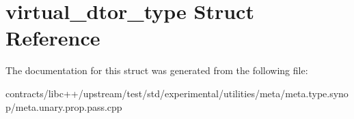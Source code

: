 \hypertarget{structvirtual__dtor__type}{}\section{virtual\+\_\+dtor\+\_\+type Struct Reference}
\label{structvirtual__dtor__type}


The documentation for this struct was generated from the following file\+:\begin{DoxyCompactItemize}
\item 
contracts/libc++/upstream/test/std/experimental/utilities/meta/meta.\+type.\+synop/meta.\+unary.\+prop.\+pass.\+cpp\end{DoxyCompactItemize}
